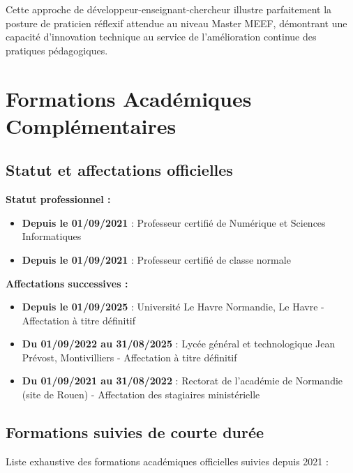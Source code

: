 Cette approche de développeur-enseignant-chercheur illustre parfaitement la posture de praticien réflexif attendue au niveau Master MEEF, démontrant une capacité d'innovation technique au service de l'amélioration continue des pratiques pédagogiques.

\section{Formations Académiques Complémentaires}

\subsection{Statut et affectations officielles}

\textbf{Statut professionnel :}
\begin{itemize}[leftmargin=*]
    \item \textbf{Depuis le 01/09/2021} : Professeur certifié de Numérique et Sciences Informatiques
    \item \textbf{Depuis le 01/09/2021} : Professeur certifié de classe normale
\end{itemize}

\textbf{Affectations successives :}
\begin{itemize}[leftmargin=*]
    \item \textbf{Depuis le 01/09/2025} : Université Le Havre Normandie, Le Havre - Affectation à titre définitif
    \item \textbf{Du 01/09/2022 au 31/08/2025} : Lycée général et technologique Jean Prévost, Montivilliers - Affectation à titre définitif
    \item \textbf{Du 01/09/2021 au 31/08/2022} : Rectorat de l'académie de Normandie (site de Rouen) - Affectation des stagiaires ministérielle
\end{itemize}

\subsection{Formations suivies de courte durée}

Liste exhaustive des formations académiques officielles suivies depuis 2021 :


